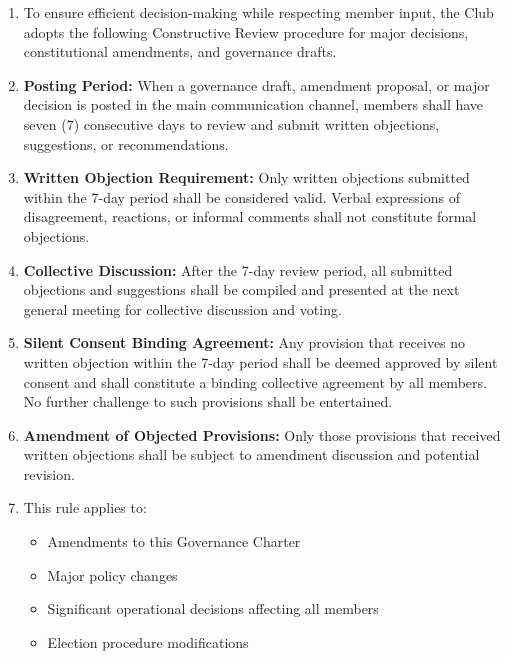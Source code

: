 \begin{enumerate}[label=\alph*), leftmargin=2em, itemsep=0.3em]
    \item To ensure efficient decision-making while respecting member input, the Club adopts the following Constructive Review procedure for major decisions, constitutional amendments, and governance drafts.
    
    \item \textbf{Posting Period:} When a governance draft, amendment proposal, or major decision is posted in the main communication channel, members shall have seven (7) consecutive days to review and submit written objections, suggestions, or recommendations.
    
    \item \textbf{Written Objection Requirement:} Only written objections submitted within the 7-day period shall be considered valid. Verbal expressions of disagreement, reactions, or informal comments shall not constitute formal objections.
    
    \item \textbf{Collective Discussion:} After the 7-day review period, all submitted objections and suggestions shall be compiled and presented at the next general meeting for collective discussion and voting.
    
    \item \textbf{Silent Consent Binding Agreement:} Any provision that receives no written objection within the 7-day period shall be deemed approved by silent consent and shall constitute a binding collective agreement by all members. No further challenge to such provisions shall be entertained.
    
    \item \textbf{Amendment of Objected Provisions:} Only those provisions that received written objections shall be subject to amendment discussion and potential revision.
    
    \item This rule applies to:
    \begin{itemize}[leftmargin=1.5em, itemsep=0.2em]
        \item Amendments to this Governance Charter
        \item Major policy changes
        \item Significant operational decisions affecting all members
        \item Election procedure modifications
    \end{itemize}
\end{enumerate}

